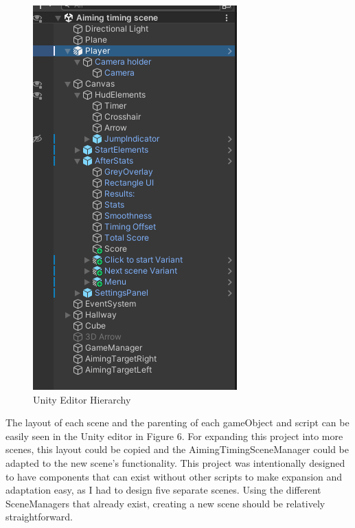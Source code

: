 \documentclass[10pt,twocolumn]{article}
\begin{document}
\begin{figure}
    \centering
    \includegraphics[width=1\linewidth]{UnityEditor.png}
    \caption{Unity Editor Hierarchy}
\end{figure}
The layout of each scene and the parenting of each gameObject and script can be easily seen in the Unity editor in Figure 6. For expanding this project into more scenes, this layout could be copied and the AimingTimingSceneManager could be adapted to the new scene's functionality. This project was intentionally designed to have components that can exist without other scripts to make expansion and adaptation easy, as I had to design five separate scenes. Using the different SceneManagers that already exist, creating a new scene should be relatively straightforward.
\end{document}
